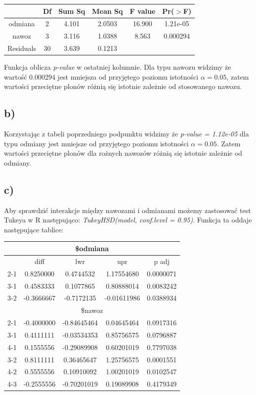 \documentclass{article}
\begin{document}
\begin{center} \begin{tabular}{|c|c|c|c|c|c|} \hline
& Df & Sum Sq & Mean Sq & F value & Pr($>$F) \\ \hline
odmiana & 2 & 4.101 & 2.0503 & 16.900 & 1.21e-05 \\ \hline
nawoz & 3 & 3.116 & 1.0388 & 8.563 & 0.000294 \\ \hline
Residuals & 30 & 3.639 & 0.1213 & & \\ \hline
\end{tabular} \end{center}

Funkcja oblicza \textit{p-value} w ostatniej kolumnie. Dla typu nawozu widzimy że wartość 0.000294 jest mniejsza od przyjętego poziomu istotności $\alpha = 0.05$, zatem wartości przeciętne plonów różnią się istotnie zależnie od stosowanego nawozu.

\subsection{b)}
Korzystając z tabeli poprzedniego podpunktu widzimy że \textit{p-value =  1.12e-05} dla typu odmiany jest mniejsze od przyjętego poziomu istotności $\alpha = 0.05$. Zatem wartości przeciętne plonów dla rożnych nawozów różnią się istotnie zależnie od odmiany.

\subsection{c)}
Aby sprawdzić interakcje między nawozami i odmianami możemy zastosować test Tukeya w R następująco: \textit{TukeyHSD(model, conf.level = 0.95)}. Funkcja ta oddaje następujące tablice:

\begin{center} \begin{tabular}{|c|c|c|c|c|} \hline
\multicolumn{5}{|c|}{\$odmiana} \\ \hline
& diff & lwr & upr & p adj \\ \hline
2-1 & 0.8250000 & 0.4744532 & 1.17554680 & 0.0000071 \\ \hline
3-1 & 0.4583333 & 0.1077865 & 0.80888014 & 0.0083242 \\ \hline
3-2 & -0.3666667 & -0.7172135 & -0.01611986 & 0.0388934 \\ \hline
\multicolumn{5}{|c|}{\$nawoz} \\ \hline
2-1 & -0.4000000 & -0.84645464 & 0.04645464 & 0.0917316 \\ \hline
3-1 & 0.4111111 & -0.03534353 & 0.85756575 & 0.0796887 \\ \hline
4-1 & 0.1555556 & -0.29089908 & 0.60201019 & 0.7797038 \\ \hline
3-2 & 0.8111111 & 0.36465647 & 1.25756575 & 0.0001551 \\ \hline
4-2 & 0.5555556 & 0.10910092 & 1.00201019 & 0.0102547 \\ \hline
4-3 & -0.2555556 & -0.70201019 & 0.19089908 & 0.4179349 \\ \hline
\end{tabular} \end{center}
\end{document}
